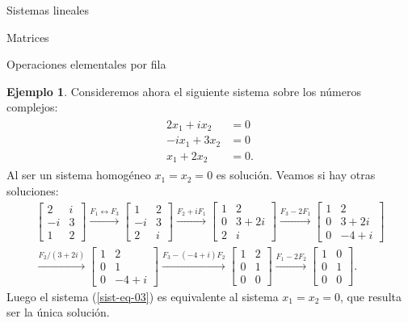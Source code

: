 \documentclass[a4paper,12pt,twoside,spanish,reqno]{amsbook}
\theoremstyle{definition}
\newtheorem{ejemplo}{Ejemplo}[section]
\theoremstyle{remark}
\begin{document}
\begin{chapter}{Sistemas lineales}
\begin{section}{Matrices}
\begin{subsection}{Operaciones elementales por fila}
				
				\begin{ejemplo}
					Consideremos ahora el siguiente sistema sobre los números complejos:
					\begin{align}\label{sist-eq-03}
					\begin{split}
					2x_1 +i x_2 &= 0 \\
					-ix_1 +3x_2  &=0 \\
					x_1 +2x_2  &= 0.
					\end{split}
					\end{align}
					Al ser un sistema homogéneo $x_1=x_2 = 0$ es solución. Veamos si hay otras soluciones: 
					\begin{multline*}
					\begin{bmatrix} 2&i \\ -i&3 \\ 1&2 \end{bmatrix}
					\stackrel{F_1\leftrightarrow F_3}{\longrightarrow} 
					\begin{bmatrix} 1&2 \\ -i&3 \\ 2&i \end{bmatrix}
					\stackrel{F_2+iF_1}{\longrightarrow} 
					\begin{bmatrix} 1&2 \\ 0&3+2i \\ 2&i \end{bmatrix}
					\stackrel{F_3-2F_1}{\longrightarrow} 
					\begin{bmatrix} 1&2 \\ 0&3+2i \\ 0&-4+i \end{bmatrix}
					\\
					\stackrel{F_2/(3+2i)}{\longrightarrow} 
					\begin{bmatrix} 1&2 \\ 0&1 \\ 0&-4+i \end{bmatrix}
					\stackrel{F_3-(-4+i)F_2}{\longrightarrow} 
					\begin{bmatrix} 1&2 \\ 0&1 \\ 0&0 \end{bmatrix}
					\stackrel{F_1-2F_2}{\longrightarrow} 
					\begin{bmatrix} 1&0 \\ 0&1 \\ 0&0 \end{bmatrix}.
					\end{multline*}
					Luego  el sistema (\ref{sist-eq-03}) es equivalente al sistema  $x_1=x_2 = 0$, que resulta ser la única solución.
				\end{ejemplo}
			\end{subsection} 
		



\end{section}
\end{chapter}
\end{document}
